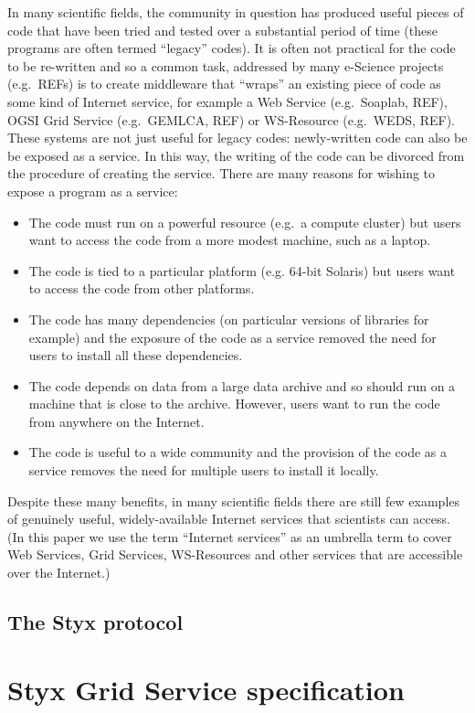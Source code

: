 \documentclass{llncs}
\begin{document}
In many scientific fields, the community in question has produced useful pieces of code that have been tried and tested over a substantial period of time (these programs are often termed ``legacy'' codes).  It is often not practical for the code to be re-written and so a common task, addressed by many e-Science projects (e.g.\ REFs) is to create middleware that ``wraps'' an existing piece of code as some kind of Internet service, for example a Web Service (e.g.\ Soaplab, REF), OGSI Grid Service (e.g.\ GEMLCA, REF) or WS-Resource (e.g.\ WEDS, REF).  These systems are not just useful for legacy codes: newly-written code can also be be exposed as a service.  In this way, the writing of the code can be divorced from the procedure of creating the service.  There are many reasons for wishing to expose a program as a service:
\begin{itemize}
	\item The code must run on a powerful resource (e.g.\ a compute cluster) but users want to access the code from a more modest machine, such as a laptop.
	\item The code is tied to a particular platform (e.g. 64-bit Solaris) but users want to access the code from other platforms.
	\item The code has many dependencies (on particular versions of libraries for example) and the exposure of the code as a service removed the need for users to install all these dependencies.
	\item The code depends on data from a large data archive and so should run on a machine that is close to the archive.  However, users want to run the code from anywhere on the Internet.
	\item The code is useful to a wide community and the provision of the code as a service removes the need for multiple users to install it locally.
\end{itemize}

Despite these many benefits, in many scientific fields there are still few examples of genuinely useful, widely-available Internet services that scientists can access.  (In this paper we use the term ``Internet services'' as an umbrella term to cover Web Services, Grid Services, WS-Resources and other services that are accessible over the Internet.)  
%
\subsection{The Styx protocol}
%
\section{Styx Grid Service specification}
\end{document}

